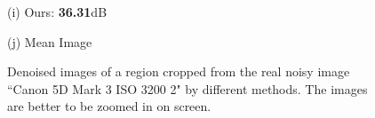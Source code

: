 \documentclass[10pt,onecolumn,letterpaper]{article}
\begin{document}
\begin{figure}[H]
{\begin{minipage}[t]{0.195\textwidth}
{\footnotesize (i) Ours: \textbf{36.31}dB}
\end{minipage}
\begin{minipage}[t]{0.195\textwidth}
\centering
{}
{\footnotesize (j) Mean Image \cite{crosschannel2016}}
\end{minipage}
}
\caption{Denoised images of a region cropped from the real noisy image ``Canon 5D Mark 3 ISO 3200 2" \cite{crosschannel2016} by different methods. The images are better to be zoomed in on screen.}
\label{fig6}
\end{figure}
\end{document}
